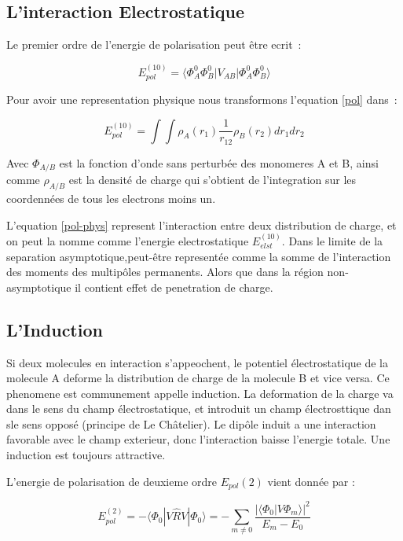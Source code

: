 \subsection{L'interaction Electrostatique}


Le premier ordre de l'energie de polarisation peut être ecrit :

\begin{equation}
E_{pol}^{(10)} = \langle \Phi_{A}^{0} \Phi_{B}^{0} |V_{AB}| \Phi_{A}^{0} \Phi_{B}^{0} \rangle  \label{pol}
\end{equation}

Pour avoir une representation physique nous transformons l'equation \ref{pol} dans :

\begin{equation}
E_{pol}^{(10)} = \int \int \rho_{A} (r_{1}) \frac{1}{r_{12}} \rho_{B} (r_{2}) dr_{1} dr_{2} \label{pol-phys}
\end{equation}

Avec $\Phi_{A/B}$ est la fonction d'onde sans perturbée des monomeres A et B, ainsi comme $\rho_{A/B}$ est la densité de charge qui s'obtient de l'integration sur les coordennées de tous les electrons moins un. 

L'equation \ref{pol-phys} represent l'interaction entre deux distribution de charge, et on peut la nomme comme l'energie electrostatique $E_{elst}^{(10)}$. Dans le limite de la separation asymptotique,peut-être representée comme la somme de l'interaction des moments des multipôles permanents. Alors que dans la région non-asymptotique il contient effet de penetration de charge.

\subsection{L'Induction}

Si deux molecules en interaction s'appeochent, le potentiel électrostatique de la molecule A deforme la distribution de charge de la molecule B et vice versa. Ce phenomene est communement appelle induction. La deformation de la charge va dans le sens du champ électrostatique, et introduit un champ électrosttique dan sle sens opposé (principe de Le Ch\^{a}telier).  Le dipôle induit a une interaction favorable avec le champ exterieur, donc l'interaction baisse l'energie totale. Une induction est toujours attractive. 

L'energie de polarisation de deuxieme ordre $E_{pol}(2)$ vient donnée par :

\begin{equation}
E_{pol}^{(2)} = - \langle \Phi_{0}| V \hat{R}V| \Phi_{0}\rangle = - \sum_{m \neq 0} \frac{|\langle \Phi_{0}|V \Phi_{m}\rangle|^{2}}{E_{m} - E_{0}} \label{pol2}
\end{equation}

